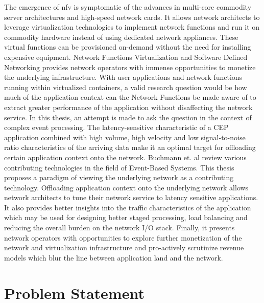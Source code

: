 \newline \newline
The emergence of \ac{nfv} is symptomatic of the advances in multi-core commodity server architectures and high-speed network cards. It allows network architects to leverage virtualization technologies to implement network functions and run it on commodity hardware instead of using dedicated network appliances. These virtual functions can be provisioned on-demand without the need for installing expensive equipment. Network Functions Virtualization and Software Defined Networking provides network operators with immense opportunities to monetize the underlying infrastructure. With user applications and network functions running within virtualized containers, a valid research question would be how much of the application context can the Network Functions be made aware of to extract greater performance of the application without disaffecting the network service. In this thesis, an attempt is made to ask the question in the context of complex event processing. The latency-sensitive characteristic of a CEP application combined with high volume, high velocity and low signal-to-noise ratio characteristics of the arriving data make it an optimal target for offloading certain application context onto the network.  
\newline \newline
Buchmann et. al \cite{Hinze:2009:EAE:1619258.1619260} review various contributing technologies in the field of Event-Based Systems. This thesis proposes a paradigm of viewing the underlying network as a contributing technology. Offloading application context onto the underlying network allows network architects to tune their network service to latency sensitive applications. It also provides better insights into the traffic characteristics of the application which may be used for designing better staged processing,  load balancing and reducing the overall burden on the network I/O stack. Finally, it presents network operators with opportunities to explore further monetization of the network and virtualization infrastructure and pro-actively scrutinize revenue models which blur the line between application land and the network.

\section{Problem Statement}

